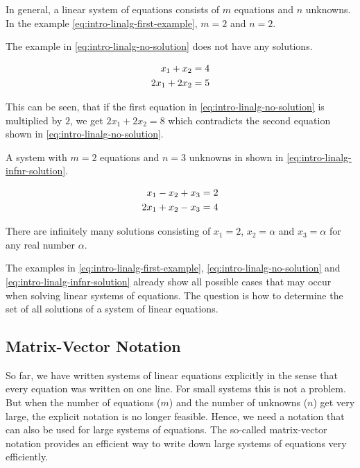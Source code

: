 \documentclass[
]{book}
\theoremstyle{definition}
\theoremstyle{definition}
\theoremstyle{definition}
\theoremstyle{remark}
\begin{document}
In general, a linear system of equations consists of \(m\) equations and \(n\) unknowns. In the example \eqref{eq:intro-linalg-first-example}, \(m=2\) and \(n=2\).

The example in \eqref{eq:intro-linalg-no-solution} does not have any solutions.

\begin{align}
 x_1 +  x_2 &= 4 \notag \\
2x_1 + 2x_2 &= 5
\label{eq:intro-linalg-no-solution}
\end{align}

This can be seen, that if the first equation in \eqref{eq:intro-linalg-no-solution} is multiplied by \(2\), we get \(2x_1 + 2x_2 = 8\) which contradicts the second equation shown in \eqref{eq:intro-linalg-no-solution}.

A system with \(m=2\) equations and \(n=3\) unknowns in shown in \eqref{eq:intro-linalg-infnr-solution}.

\begin{align}
 x_1 -  x_2 +  x_3 &= 2 \notag \\
2x_1 +  x_2 -  x_3 &= 4  
\label{eq:intro-linalg-infnr-solution}
\end{align}

There are infinitely many solutions consisting of \(x_1 = 2\), \(x_2 = \alpha\) and \(x_3 = \alpha\) for any real number \(\alpha\).

The examples in \eqref{eq:intro-linalg-first-example}, \eqref{eq:intro-linalg-no-solution} and \eqref{eq:intro-linalg-infnr-solution} already show all possible cases that may occur when solving linear systems of equations. The question is how to determine the set of all solutions of a system of linear equations.

\hypertarget{intro-linalg-matrix-vector-notation}{%
\subsection{Matrix-Vector Notation}\label{intro-linalg-matrix-vector-notation}}

So far, we have written systems of linear equations explicitly in the sense that every equation was written on one line. For small systems this is not a problem. But when the number of equations (\(m\)) and the number of unknowns (\(n\)) get very large, the explicit notation is no longer feasible. Hence, we need a notation that can also be used for large systems of equations. The so-called matrix-vector notation provides an efficient way to write down large systems of equations very efficiently.
\end{document}
